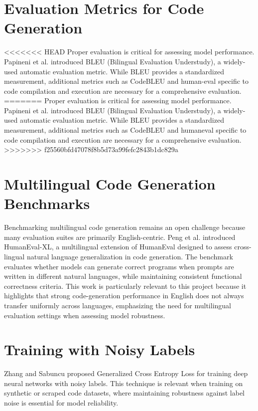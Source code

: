 \section{Evaluation Metrics for Code Generation}
<<<<<<< HEAD
Proper evaluation is critical for assessing model performance. Papineni et al. \cite{Papineni2002} introduced BLEU (Bilingual Evaluation Understudy), a widely-used automatic evaluation metric. While BLEU provides a standardized measurement, additional metrics such as CodeBLEU and human-eval specific to code compilation and execution are necessary for a comprehensive evaluation.
=======
Proper evaluation is critical for assessing model performance. Papineni et al. \cite{Papineni2002} introduced BLEU (Bilingual Evaluation Understudy), a widely-used automatic evaluation metric. While BLEU provides a standardized measurement, additional metrics such as CodeBLEU and humaneval specific to code compilation and execution are necessary for a comprehensive evaluation.
>>>>>>> f25560bfd47078f8b5d73a99fefc2843b1dc829a

\section{Multilingual Code Generation Benchmarks}
Benchmarking multilingual code generation remains an open challenge because many evaluation suites are primarily English-centric. Peng et al. \cite{Peng2024HumanEvalXL} introduced HumanEval-XL, a multilingual extension of HumanEval designed to assess cross-lingual natural language generalization in code generation. The benchmark evaluates whether models can generate correct programs when prompts are written in different natural languages, while maintaining consistent functional correctness criteria. This work is particularly relevant to this project because it highlights that strong code-generation performance in English does not always transfer uniformly across languages, emphasizing the need for multilingual evaluation settings when assessing model robustness.

\section{Training with Noisy Labels}
Zhang and Sabuncu \cite{Zhang2018GCE} proposed Generalized Cross Entropy Loss for training deep neural networks with noisy labels. This technique is relevant when training on synthetic or scraped code datasets, where maintaining robustness against label noise is essential for model reliability.

